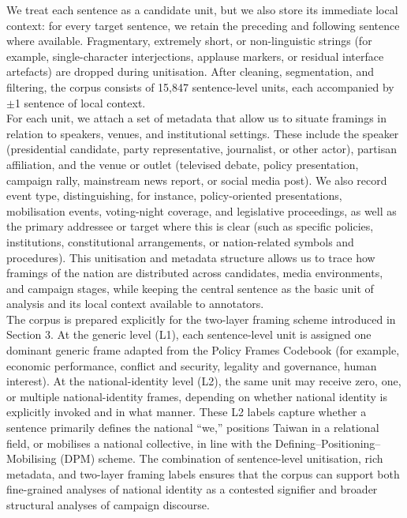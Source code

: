 \documentclass[man,12pt]{apa7}
\begin{document}
We treat each sentence as a candidate unit, but we also store its immediate local context: for every target sentence, we retain the preceding and following sentence where available. 
Fragmentary, extremely short, or non-linguistic strings (for example, single-character interjections, applause markers, or residual interface artefacts) are dropped during unitisation. 
After cleaning, segmentation, and filtering, the corpus consists of 15,847 sentence-level units, each accompanied by $\pm$1 sentence of local context.\\%
For each unit, we attach a set of metadata that allow us to situate framings in relation to speakers, venues, and institutional settings. 
These include the speaker (presidential candidate, party representative, journalist, or other actor), partisan affiliation, and the venue or outlet (televised debate, policy presentation, campaign rally, mainstream news report, or social media post). 
We also record event type, distinguishing, for instance, policy-oriented presentations, mobilisation events, voting-night coverage, and legislative proceedings, as well as the primary addressee or target where this is clear (such as specific policies, institutions, constitutional arrangements, or nation-related symbols and procedures). 
This unitisation and metadata structure allows us to trace how framings of the nation are distributed across candidates, media environments, and campaign stages, while keeping the central sentence as the basic unit of analysis and its local context available to annotators.\\%
The corpus is prepared explicitly for the two-layer framing scheme introduced in Section 3. 
At the generic level (L1), each sentence-level unit is assigned one dominant generic frame adapted from the Policy Frames Codebook (for example, economic performance, conflict and security, legality and governance, human interest). 
At the national-identity level (L2), the same unit may receive zero, one, or multiple national-identity frames, depending on whether national identity is explicitly invoked and in what manner. 
These L2 labels capture whether a sentence primarily defines the national ``we,'' positions Taiwan in a relational field, or mobilises a national collective, in line with the Defining--Positioning--Mobilising (DPM) scheme. 
The combination of sentence-level unitisation, rich metadata, and two-layer framing labels ensures that the corpus can support both fine-grained analyses of national identity as a contested signifier and broader structural analyses of campaign discourse.\\%
\end{document}
